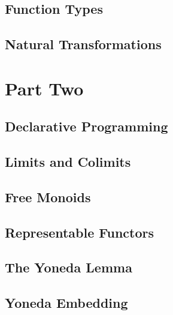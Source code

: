 \chapter{Function Types}\label{function-types}


\chapter{Natural Transformations}\label{chap-natural-transformations}


\part{Part Two}

\chapter{Declarative Programming}\label{declarative-programming}


\chapter{Limits and Colimits}\label{limits-and-colimits}


\chapter{Free Monoids}\label{chap-free-monoids}


\chapter{Representable Functors}\label{chap-representable-functors}


\chapter{The Yoneda Lemma}\label{the-yoneda-lemma}


\chapter{Yoneda Embedding}\label{yoneda-embedding}


